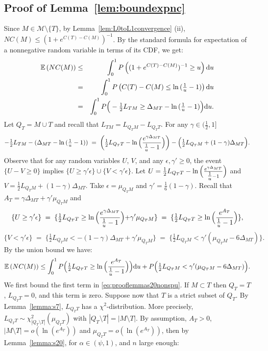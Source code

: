 \documentclass[aos]{imsart}
\theoremstyle{plain}
\newcommand{\E}{\mathbb{E}}
\begin{document}
\subsection{Proof of Lemma~\ref{lem:boundexpnc}}
Since $M\in \mathcal M\setminus \{T\}$, by Lemma~\ref{lem:L0toL1convergence} (ii),  $NC(M)\leq (1+e^{C(T)-C(M)})^{-1}$.  By the standard formula for expectation of a nonnegative random variable in terms of its CDF, we get:
\begin{eqnarray*}
  \E\left(NC(M)\right)  &\leq& \int_0^1 P\left((1+e^{C(T)-C(M)})^{-1}\geq u\right){\rm d} u\\
  &=&\int_0^1 P\left(C(T)-C(M) \leq \ln{(\tfrac1u-1)}\right){\rm d}u\\
  &=&\int_0^1 P\Big(-\tfrac12 L_{TM} \geq \Delta_{MT}-\ln{(\tfrac1u-1)}\Big) {\rm d}u.
\end{eqnarray*}
Let $Q_T=M \cup T$ and recall that $L_{TM}=L_{Q_TM}-L_{Q_TT}$. For any $\gamma\in (\frac{1}{2},1]$
$$
-\tfrac12 L_{TM} -(\Delta_{MT}-\ln{(\tfrac1u-1)})\;=\;\left(\tfrac12 L_{Q_TT}-\ln{\Bigl(\frac{e^{\gamma\Delta_{MT}}}{\tfrac1u-1}\Bigl)}\right)-\Bigl(\tfrac12 L_{Q_TM}+(1-\gamma)\Delta_{MT}\Bigl).
$$
Observe that for any random variables $U$, $V$, and any $\epsilon,\gamma' \geq 0$, the event $
\{U-V \geq 0\}$ implies $\{U \geq \gamma' \epsilon\}\cup
\{V  < \gamma' \epsilon\}$. Let $U=\tfrac12 L_{Q_TT}-\ln{\Bigl(\frac{e^{\gamma\Delta_{MT}}}{\tfrac1u-1}\Bigl)}$ and $V=\tfrac12 L_{Q_TM}+(1-\gamma)\Delta_{MT}$. Take $\epsilon=\mu_{Q_TM}$ and $\gamma'=\tfrac16({1-\gamma})$. Recall that $A_T=\gamma\Delta_{MT}+\gamma'\mu_{Q_TM}$ and
$$
\{U\geq \gamma'\epsilon\}\;=\;\{\tfrac12 L_{Q_TT}\geq \ln{\Bigl(\frac{e^{\gamma\Delta_{MT}}}{\tfrac1u-1}}\Bigl)+\gamma'\mu_{Q_TM}\}\;=\;\{\tfrac12 L_{Q_TT}\geq \ln{\Bigl(\frac{e^{A_T}}{\tfrac1u-1}}\Bigl)\},
$$
$$
\{V<\gamma'\epsilon\}\;=\;\{\tfrac12 L_{Q_TM}<-(1-\gamma)\Delta_{MT}+\gamma'\mu_{Q_TM}\}\;=\;\{\tfrac12 L_{Q_TM}<\gamma'(\mu_{Q_TM}-6\Delta_{MT})\}.
$$
By the union bound we have:
\begin{equation}\label{eq:prooflemmas20nonspu}
    \E\left(NC(M)\right)  \leq \int_0^1P\Bigl(\tfrac12 L_{Q_TT}\geq \ln{\Bigl(\frac{e^{A_T}}{\tfrac1u-1}\Bigl)}\Bigl){\rm d}u+ P\Bigl(\tfrac12 L_{Q_TM}<\gamma'(\mu_{Q_TM}-6\Delta_{MT})\Bigl).
\end{equation}
We first bound the first term in \eqref{eq:prooflemmas20nonspu}. If $M \subset T$ then $Q_T=T$, $L_{Q_TT}=0$, and this term is zero. Suppose now that $T$ is a strict subset of $Q_T$. By Lemma~\ref{lemma:s7}, $L_{Q_TT}$ has a $\chi^2$-distribution. More precisely, $L_{Q_TT} \sim \mathcal{\chi}_{|Q_T\setminus T|}^2(\mu_{Q_TT})$ with $|Q_T\setminus T|=|M\setminus T|$. By assumption, $A_T>0$, $|M\setminus T|=o(\ln(e^{A_T}))$ and $\mu_{Q_TT}=o(\ln(e^{A_T}))$, then  by Lemma~\ref{lemma:s20}, for $\alpha\in(\psi,1)$, and $n$ large enough:
\end{document}
